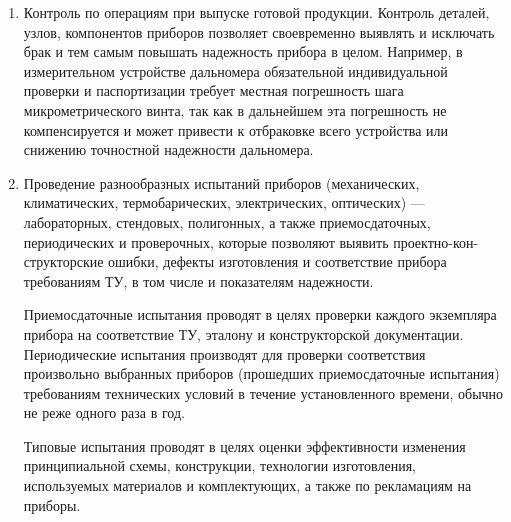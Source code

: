 \begin{enumerate}
\item Контроль по операциям при выпуске готовой продукции. Контроль деталей, узлов, компонентов приборов позволяет своевременно выявлять и исключать брак и тем самым повышать надежность прибора в целом. Например, в измерительном устройстве дальномера обязательной индивидуальной проверки и паспортизации требует местная погрешность шага микрометрического винта, так как в дальнейшем эта погрешность не компенсируется и может привести к отбраковке всего устройства или снижению точностной надежности дальномера.
\item Проведение разнообразных испытаний приборов (механических, климатических, термобарических, электрических, оптических) --- лабораторных, стендовых, полигонных, а также приемосдаточных, периодических и проверочных, которые позволяют выявить проектно-кон-структорские ошибки, дефекты изготовления и соответствие прибора требованиям ТУ, в том числе и показателям надежности.

Приемосдаточные испытания проводят в целях проверки каждого экземпляра прибора на соответствие ТУ, эталону и конструкторской документации.
Периодические испытания производят для проверки соответствия произвольно выбранных приборов (прошедших приемосдаточные испытания) требованиям технических условий в течение установленного времени, обычно не реже одного раза в год.

Типовые испытания проводят в целях оценки эффективности изменения принципиальной схемы, конструкции, технологии изготовления, используемых материалов и комплектующих, а также по рекламациям на приборы.
\end{enumerate}

